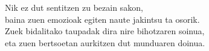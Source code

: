 \documentclass[]{report}
\begin{document}
\noindent Nik ez dut sentitzen zu bezain sakon, \\
baina zuen emozioak egiten naute jakintsu ta osorik. \\
Zuek bidalitako taupadak dira nire bihotzaren soinua, \\
eta zuen bertsoetan aurkitzen dut munduaren doinua. \\









\end{document}
